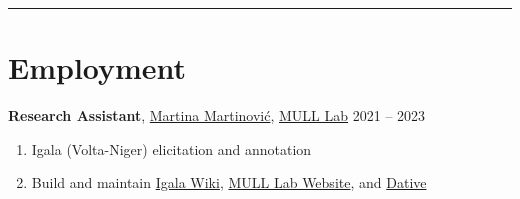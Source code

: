 \documentclass[margin,line]{resume}
\begin{document}
\begin{resume}
	\vspace{-1.2em}\rule{\textwidth}{0.4pt}





	\section{\mysidestyle Employment}

	\textbf{Research Assistant}, \href{https://inamartinovic.com/}{Martina Martinović}, \href{https://mull-lab.org/}{MULL Lab} \hfill 2021 -- 2023
	\begin{enumerate}[-, leftmargin=1em, topsep=4pt]
		\item[] Igala (Volta-Niger) elicitation and annotation
		\item[] Build and maintain \href{https://wiki.mull-lab.org/Igala/}{Igala Wiki}, \href{https://mull-lab.org/}{MULL Lab Website}, and \href{https://github.com/dativebase/dativerf}{Dative}
	\end{enumerate}%

	\begin{comment}
	\textbf{Full Stack and Mobile Developer}, \href{https://playmind.com/}{PLAYMIND}, Montréal \hfill Mar -- Aug 2021
	\begin{enumerate}[-, leftmargin=1em, topsep=4pt]
		\item[] Developed~\href{https://playbox.games/\#home}{
			      PLAYBOX online management portal and Android App}
	\end{enumerate}

	\textbf{Freelance Programmer}, Montréal \hfill 2019 -- 2020
	\begin{enumerate}[-, leftmargin=1em, topsep=4pt]
		\item[] Web Development and Python tutoring
	\end{enumerate}

	\textbf{Junior Developer}, \href{https://gls-canada.com/en/dicom/corp/home}{GLS (\textit{fka} Dicom)}, Montréal \hfill Jan -- May 2019
	\begin{enumerate}[-, leftmargin=1em, topsep=4pt]
		\item[] Worked on \href{https://gls-canada.com/en/dicom/about-us/news/dicom-launches-smart4-shipping}{smart4 shipping platform} back-end
	\end{enumerate}
	\end{comment}


\end{resume}
\end{document}
